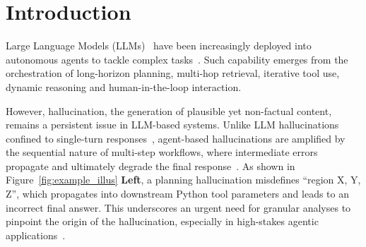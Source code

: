 \section{Introduction}
\label{sec:intro}
Large Language Models (LLMs)~\cite{chatgpt2025, comanici2025gemini} have been increasingly deployed into autonomous agents to tackle complex tasks~\cite{mialon2023gaia,yang2024swe,zheng2024gpt}. Such capability emerges from the orchestration of long-horizon planning, multi-hop retrieval, iterative tool use, dynamic reasoning and human-in-the-loop interaction. 

However, hallucination, the generation of plausible yet non-factual content, remains a persistent issue in LLM-based systems. Unlike LLM hallucinations confined to single-turn responses~\cite{huang2025survey,ji2023survey}, agent-based hallucinations are amplified by the sequential nature of multi-step workflows, where intermediate errors propagate and ultimately degrade the final response~\cite{zhou2025guardian}. As shown in Figure~\ref{fig:example_illus} \textbf{Left}, a planning hallucination misdefines ``region X, Y, Z'', which propagates into downstream Python tool parameters and leads to an incorrect final answer. This underscores an urgent need for granular analyses to pinpoint the origin of the hallucination, especially in high-stakes agentic applications~\cite{huang2025survey}. 



